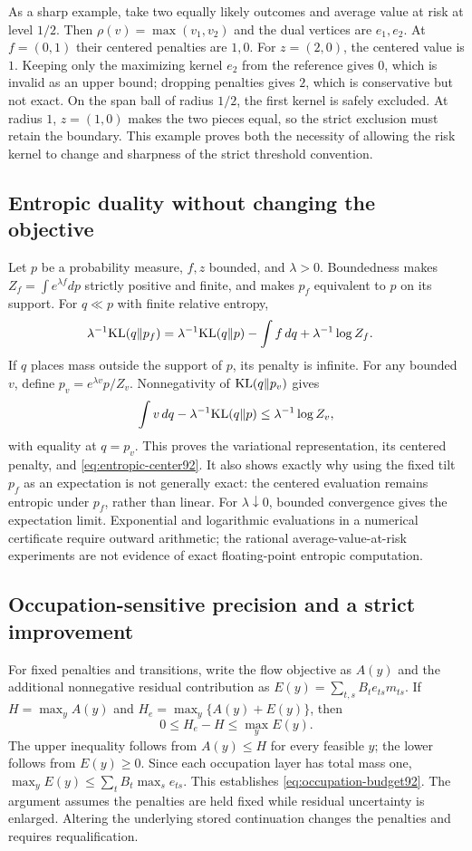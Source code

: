 As a sharp example, take two equally likely outcomes and average value at risk at level $1/2$. Then $\rho(v)=\max(v_1,v_2)$ and the dual vertices are $e_1,e_2$. At $f=(0,1)$ their centered penalties are $1,0$. For $z=(2,0)$, the centered value is $1$. Keeping only the maximizing kernel $e_2$ from the reference gives $0$, which is invalid as an upper bound; dropping penalties gives $2$, which is conservative but not exact. On the span ball of radius $1/2$, the first kernel is safely excluded. At radius $1$, $z=(1,0)$ makes the two pieces equal, so the strict exclusion must retain the boundary. This example proves both the necessity of allowing the risk kernel to change and sharpness of the strict threshold convention.

\subsection{Entropic duality without changing the objective}
Let $p$ be a probability measure, $f,z$ bounded, and $\lambda>0$. Boundedness makes $Z_f=\int e^{\lambda f}dp$ strictly positive and finite, and makes $p_f$ equivalent to $p$ on its support. For $q\ll p$ with finite relative entropy,
\begin{align*}
 \lambda^{-1}{\rm KL}(q\Vert p_f)
 &=\lambda^{-1}{\rm KL}(q\Vert p)-\int f\,dq
                                      +\lambda^{-1}\log Z_f.
\end{align*}
If $q$ places mass outside the support of $p$, its penalty is infinite. For any bounded $v$, define $p_v=e^{\lambda v}p/Z_v$. Nonnegativity of ${\rm KL}(q\Vert p_v)$ gives
\[
 \int v\,dq-\lambda^{-1}{\rm KL}(q\Vert p)
 \le\lambda^{-1}\log Z_v,
\]
with equality at $q=p_v$. This proves the variational representation, its centered penalty, and \eqref{eq:entropic-center92}. It also shows exactly why using the fixed tilt $p_f$ as an expectation is not generally exact: the centered evaluation remains entropic under $p_f$, rather than linear. For $\lambda\downarrow0$, bounded convergence gives the expectation limit. Exponential and logarithmic evaluations in a numerical certificate require outward arithmetic; the rational average-value-at-risk experiments are not evidence of exact floating-point entropic computation.

\subsection{Occupation-sensitive precision and a strict improvement}
For fixed penalties and transitions, write the flow objective as $A(y)$ and the additional nonnegative residual contribution as $E(y)=\sum_{t,s}B_te_{ts}m_{ts}$. If $H=\max_y A(y)$ and $H_e=\max_y\{A(y)+E(y)\}$, then
\[
 0\le H_e-H\le\max_y E(y).
\]
The upper inequality follows from $A(y)\le H$ for every feasible $y$; the lower follows from $E(y)\ge0$. Since each occupation layer has total mass one, $\max_y E(y)\le\sum_t B_t\max_s e_{ts}$. This establishes \eqref{eq:occupation-budget92}. The argument assumes the penalties are held fixed while residual uncertainty is enlarged. Altering the underlying stored continuation changes the penalties and requires requalification.


